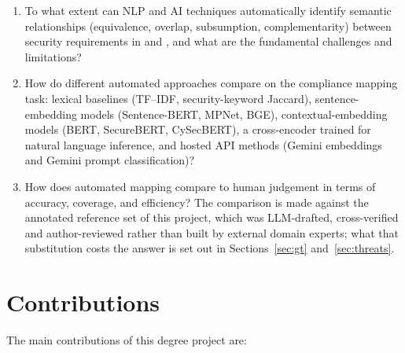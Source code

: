 \begin{enumerate}[label=\textbf{RQ\arabic*.},leftmargin=3.2em]
  \item To what extent can NLP and AI techniques automatically identify
  semantic relationships (equivalence, overlap, subsumption, complementarity)
  between security requirements in \standardA{} and \standardB{}, and what are
  the fundamental challenges and limitations?
  \item How do different automated approaches compare on the compliance mapping
  task: lexical baselines (TF--IDF, security-keyword Jaccard),
  sentence-embedding models (Sentence-BERT, MPNet, BGE), contextual-embedding
  models (BERT, SecureBERT, CySecBERT), a cross-encoder trained for natural
  language inference, and hosted API methods (Gemini embeddings and Gemini
  prompt classification)?
  \item How does automated mapping compare to human judgement in terms of
  accuracy, coverage, and efficiency? The comparison is made against the
  annotated reference set of this project, which was LLM-drafted, cross-verified
  and author-reviewed rather than built by external domain experts; what that
  substitution costs the answer is set out in Sections~\ref{sec:gt}
  and~\ref{sec:threats}.
\end{enumerate}

\section{Contributions}\label{sec:contributions}

The main contributions of this degree project are:

